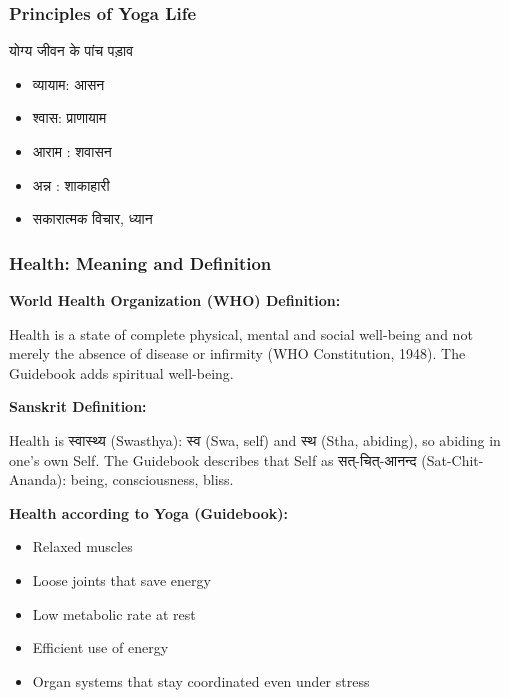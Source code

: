 \begin{frame}[fragile]\frametitle{Principles of Yoga Life}
योग्य जीवन के पांच पड़ाव 
      \begin{itemize}
		\item  व्यायाम: आसन 
		\item  श्वास: प्राणायाम 
		\item  आराम : शवासन 
		\item  अन्न : शाकाहारी 
		\item  सकारात्मक विचार, ध्यान 
	  \end{itemize}

\end{frame}
\begin{frame}[fragile]\frametitle{Health: Meaning and Definition}
    \textbf{World Health Organization (WHO) Definition:}
    
        Health is a state of complete physical, mental and social well-being and not merely the absence of disease or infirmity (WHO Constitution, 1948). The Guidebook adds spiritual well-being.
    

    
    \textbf{Sanskrit Definition:} 
    
        Health is स्वास्थ्य (Swasthya): स्व (Swa, self) and स्थ (Stha, abiding), so abiding in one's own Self. The Guidebook describes that Self as सत्-चित्-आनन्द (Sat-Chit-Ananda): being, consciousness, bliss.
    

    
    \textbf{Health according to Yoga (Guidebook):}
    \begin{itemize}
        \item Relaxed muscles
        \item Loose joints that save energy
        \item Low metabolic rate at rest
        \item Efficient use of energy
        \item Organ systems that stay coordinated even under stress
    \end{itemize}
\end{frame}

